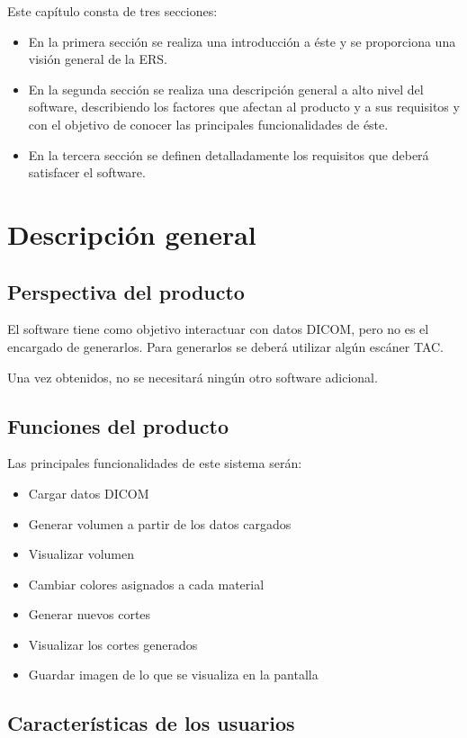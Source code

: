 Este capítulo consta de tres secciones:
\begin{itemize}
	\item En la primera sección se realiza una introducción a éste y se proporciona una visión general de la ERS.
	\item En la segunda sección se realiza una descripción general a alto nivel del software, describiendo los factores que afectan al producto y a sus requisitos y con el objetivo de conocer las principales funcionalidades de éste.
	\item En la tercera sección se definen detalladamente los requisitos que deberá satisfacer el software.
\end{itemize}

\section{Descripción general}

\subsection{Perspectiva del producto}

El software \myTitle tiene como objetivo interactuar con datos DICOM, pero no es el encargado de generarlos. Para generarlos se deberá utilizar algún escáner TAC.

Una vez obtenidos, no se necesitará ningún otro software adicional.

\subsection{Funciones del producto}

Las principales funcionalidades de este sistema serán:
\begin{itemize}
	\item Cargar datos DICOM
	\item Generar volumen a partir de los datos cargados
	\item Visualizar volumen
	\item Cambiar colores asignados a cada material
	\item Generar nuevos cortes
	\item Visualizar los cortes generados
	\item Guardar imagen de lo que se visualiza en la pantalla
\end{itemize}

\subsection{Características de los usuarios}

